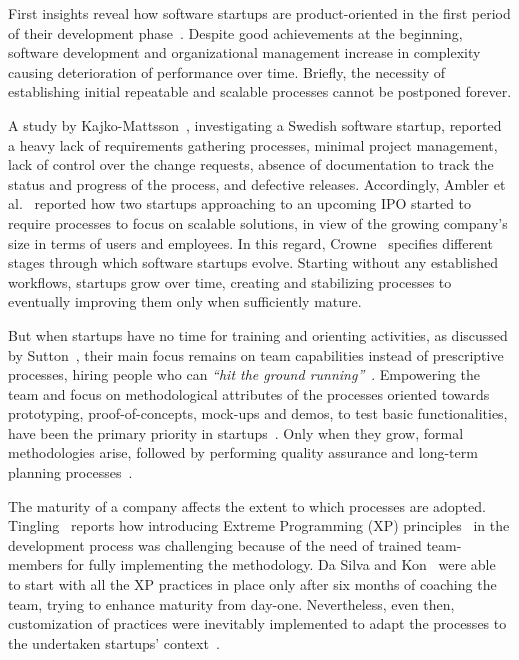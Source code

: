 \documentclass[10pt,journal,letterpaper,compsoc]{IEEEtran}
\begin{document}
First insights reveal how software startups are product-oriented in the first
period of their development phase~\cite{Heitlager2007}. Despite good
achievements at the beginning, software development and organizational
management increase in complexity~\cite{1456074,Banker1998} causing
deterioration of performance over time. Briefly, the necessity of establishing
initial repeatable and scalable processes cannot be postponed forever.

A study by Kajko-Mattsson~\cite{Kajko-Mattsson2008}, investigating a
Swedish software startup, reported a heavy lack of requirements gathering
processes, minimal project management, lack of control over the change requests,
absence of documentation to track the status and progress of the process, and
defective releases. Accordingly, Ambler et al.~\cite{Ambler2002} reported how 
two startups approaching to an upcoming IPO started to require processes to 
focus on scalable solutions, in view of the growing company's size in terms of 
users and employees. In this regard, Crowne~\cite{Crowne2002} specifies 
different stages through which software startups evolve. Starting without any 
established workflows, startups grow over time, creating and stabilizing 
processes to eventually improving them only when sufficiently mature.

But when startups have no time for training and orienting activities, as
discussed by Sutton~\cite{Sutton2000}, their main focus remains on team 
capabilities instead of prescriptive processes, hiring people who can 
\textit{``hit the ground running''}~\cite{Yoffie1999}. Empowering the team and 
focus on methodological attributes of the processes oriented towards 
prototyping, proof-of-concepts, mock-ups and demos, to test basic 
functionalities, have been  the primary priority in startups~\cite{Camel1994a}. 
Only when they grow, formal
methodologies arise, followed by performing quality assurance and long-term
planning processes~\cite{Yoffie1999}.

The maturity of a company affects the extent to which processes are adopted.
Tingling~\cite{Tingling2007} reports how introducing Extreme Programming (XP)
principles~\cite{Beck:2004:EPE:1076267} in the development process was
challenging because of the need of trained team-members for fully implementing
the methodology. Da Silva and Kon~\cite{Silva2005} were able to start with all
the XP practices in place only after six months of coaching the team, trying to
enhance maturity from day-one. Nevertheless, even then, customization of
practices were inevitably implemented to adapt the processes to the undertaken
startups' context~\cite{Deias}.
\end{document}
